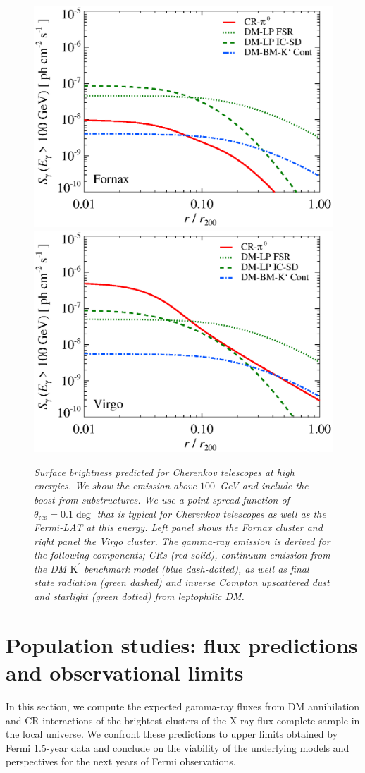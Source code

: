 \documentclass[10pt,aps,pra,reprint,amsmath,amsfonts,amssymb,showpacs,nofootinbib,floatfix]{revtex4-1}
\newcommand{\rmn}{\mathrm}
\newcommand{\psf}{\theta_\rmn{res}}
\newcommand{\Kp}{\rmn{K}^\prime}
\begin{document}
\begin{figure}
\begin{minipage}{2.0\columnwidth}
  \includegraphics[width=0.49\columnwidth]{figures/SB.Fornax.v11.SF300.SubMass.elmu.eps}
  \includegraphics[width=0.49\columnwidth]{figures/SB.Virgo.v11.SF300.SubMass.elmu.eps}
\caption{\it Surface brightness predicted for Cherenkov telescopes at
  high energies. We show the emission above $100$~GeV and include the
  boost from substructures. We use a point spread function of
  $\psf=0.1\deg$ that is typical for Cherenkov
  telescopes as well as the Fermi-LAT at this energy. Left panel shows
  the Fornax cluster and right panel the Virgo cluster. The gamma-ray
  emission is derived for the following components; CRs (red solid),
  continuum emission from the DM $\Kp$ benchmark model (blue
  dash-dotted), as well as final state radiation (green dashed) and
  inverse Compton upscattered dust and starlight (green dotted) from
  leptophilic DM.}
 \label{fig:SB_IACTs}
\end{minipage}
\end{figure}



\section{Population studies: flux predictions and observational limits}

In this section, we compute the expected gamma-ray fluxes from DM
annihilation and CR interactions of the brightest clusters of the
X-ray flux-complete sample in the local universe. We confront these
predictions to upper limits obtained by Fermi 1.5-year data and
conclude on the viability of the underlying models and perspectives
for the next years of Fermi observations.
\end{document}
